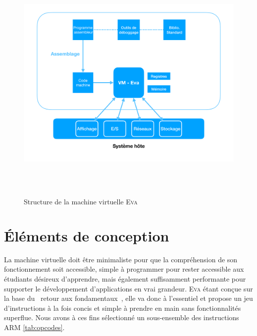 \documentclass[11pt,twoside,french]{article}
\makeatletter
\providecommand{\og}{\leavevmode\flqq~}%
\providecommand{\fg}{\ifdim\lastskip>\z@\unskip\fi~\frqq}%
\newcommand{\noun}[1]{\textsc{#1}}
\makeatother
\begin{document}
\begin{figure}[p]
  \centering
  \includegraphics[width=12cm, height=12cm, keepaspectratio]{diagram1_graph.pdf}
  \caption{Structure de la machine virtuelle \noun{Eva}}
  \label{fig:diagram1}
\end{figure}


\section{Éléments de conception}

La machine virtuelle doit être minimaliste pour que la compréhension de son fonctionnement soit accessible, simple à programmer pour rester accessible aux étudiants désireux d'apprendre, mais également suffisamment performante pour supporter le développement d'applications en vrai grandeur. \noun{Eva} étant conçue sur la base du \og retour aux fondamentaux\fg , elle va donc à l'essentiel et propose un jeu d'instructions à la fois concis et simple à prendre en main sans fonctionnalités superflue. Nous avons à ces fins sélectionné un sous-ensemble des instructions ARM \ref{tab:opcodes}.
\end{document}
